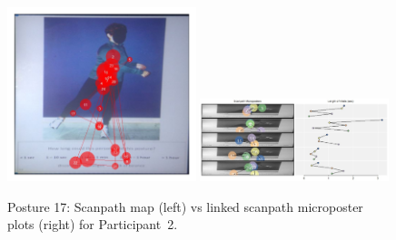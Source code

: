\documentclass[11pt]{asaproc}
\begin{document}
\begin{figure}[t]
\begin{center} 
\includegraphics[width=0.49\textwidth]{figures/Subject13_scanpath_posture17.jpg} \hspace{1pt}
\includegraphics[height=0.45\textwidth,width=0.49\textwidth]{figures/Subject13_LSM_posture17_clipped.jpg}
\end{center}
\caption{\label{ScanpathsLSM17}Posture 17: Scanpath map (left) vs linked scanpath microposter plots (right) for Participant~2.}
\end{figure}
\end{document}
